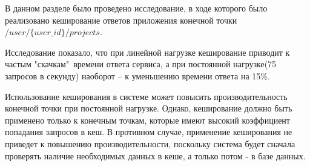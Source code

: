 В данном разделе было проведено исследование, в ходе которого было реализовано кеширование ответов приложения конечной точки \\$/user/\{user\_id\}/projects$.

Исследование показало, что при линейной нагрузке кеширование приводит к частым "скачкам"\ времени ответа сервиса, а при постоянной нагрузке(75 запросов в секунду) наоборот -- к уменьшению времени ответа на 15\%. 

Использование кеширования в системе может повысить производительность конечной точки при постоянной нагрузке. Однако, кеширование должно быть применено только к конечным точкам, которые имеют высокий коэффициент попадания запросов в кеш. В противном случае, применение кеширования не приведет к повышению производительности, поскольку система будет сначала проверять наличие необходимых данных в кеше, а только потом - в базе данных.





\pagebreak